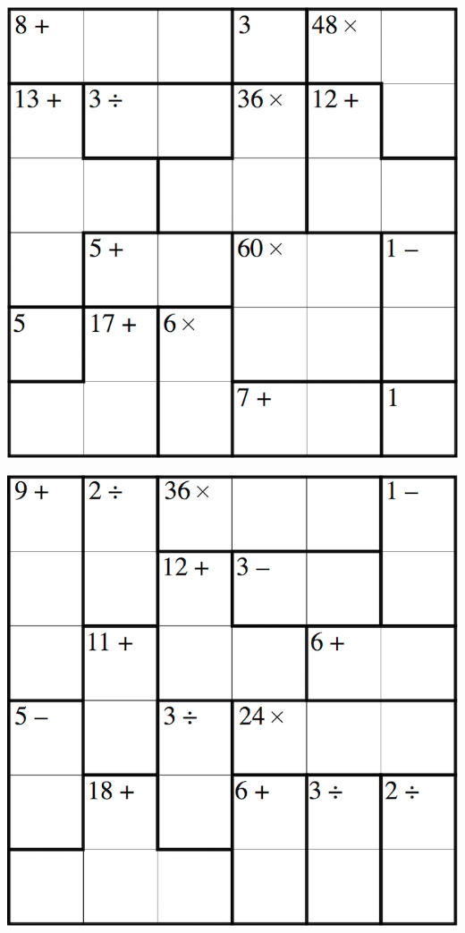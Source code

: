
\includegraphics[scale=1]{Gambar/Lampiran/6x6_11.png}

\includegraphics[scale=1]{Gambar/Lampiran/6x6_12.png}
